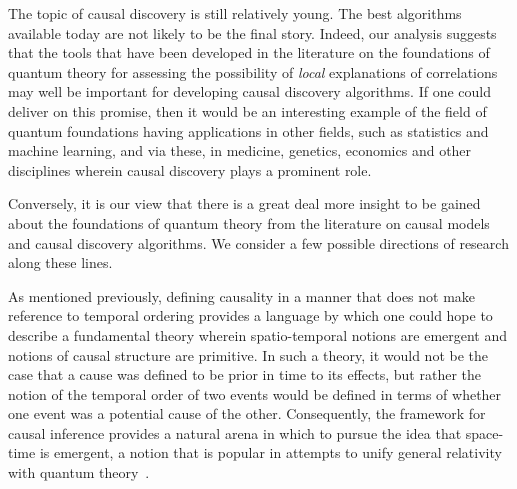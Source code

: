 \documentclass[letterpaper,onecolumn,nofootinbib]{revtex4}
\begin{document}
The topic of causal discovery is still relatively young. The best algorithms
available today are not likely to be the final story.
Indeed, our analysis suggests that the tools that have been developed in
the literature on the foundations of quantum theory for assessing the possibility of \emph{local} explanations of correlations may well be important
for developing causal discovery algorithms. If one could deliver on this
promise, then it would be an interesting example of the field of quantum
foundations having applications in other fields, such as statistics and machine learning, and via these, in medicine, genetics, economics and other disciplines wherein causal discovery plays a prominent role.

Conversely, it is our view that there is a great deal more insight to be
gained about the foundations of quantum theory from the literature on causal
models and causal discovery algorithms.
We consider a few possible directions of research along these lines.

As mentioned previously,  defining causality in a manner that does not make reference to temporal ordering provides a language by which one could hope to describe a fundamental theory wherein spatio-temporal notions are emergent and notions of causal structure are primitive. In such a theory, it would not be the case that a cause was defined to be prior in time to its effects, but rather the notion of the temporal order of two events would be defined in terms of whether one event was a potential cause of the other.  Consequently, the framework for causal inference provides a natural arena in which to pursue the idea that space-time is emergent, a notion that is popular in attempts to unify general relativity with quantum theory~\cite{markopoulou2007new,dowker2005causal}.
\end{document}
